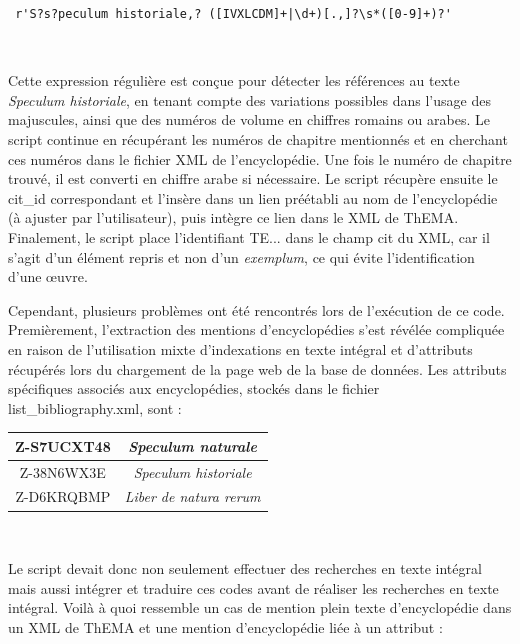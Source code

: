 \begin{verbatim} r'S?s?peculum historiale,? ([IVXLCDM]+|\d+)[.,]?\s*([0-9]+)?' \end{verbatim}

\

Cette expression régulière est conçue pour détecter les références au texte \textit{Speculum historiale}, en tenant compte des variations possibles dans l'usage des majuscules, ainsi que des numéros de volume en chiffres romains ou arabes. Le script continue en récupérant les numéros de chapitre mentionnés et en cherchant ces numéros dans le fichier XML de l'encyclopédie. Une fois le numéro de chapitre trouvé, il est converti en chiffre arabe si nécessaire. Le script récupère ensuite le cit\_id correspondant et l'insère dans un lien préétabli au nom de l'encyclopédie (à ajuster par l'utilisateur), puis intègre ce lien dans le XML de ThEMA. Finalement, le script place l'identifiant TE... dans le champ cit du XML, car il s'agit d'un élément repris et non d'un \textit{exemplum}, ce qui évite l'identification d'une œuvre.

Cependant, plusieurs problèmes ont été rencontrés lors de l'exécution de ce code. Premièrement, l'extraction des mentions d'encyclopédies s'est révélée compliquée en raison de l'utilisation mixte d'indexations en texte intégral et d'attributs récupérés lors du chargement de la page web de la base de données. Les attributs spécifiques associés aux encyclopédies, stockés dans le fichier list\_bibliography.xml, sont : \\

\begin{center}
\begin{tabular}{|c|c|}
	\hline
	Z-S7UCXT48 & \index{Speculum naturale}\textit{Speculum naturale} \\
	\hline
	Z-38N6WX3E & \index{Speculum historiale}\textit{Speculum historiale}  \\
	\hline
	Z-D6KRQBMP & \textit{Liber de natura rerum} \\
	\hline
\end{tabular}
\end{center}

\

Le script devait donc non seulement effectuer des recherches en texte intégral mais aussi intégrer et traduire ces codes avant de réaliser les recherches en texte intégral. Voilà à quoi ressemble un cas de mention plein texte d'encyclopédie dans un XML de ThEMA et une mention d'encyclopédie liée à un attribut : \\

